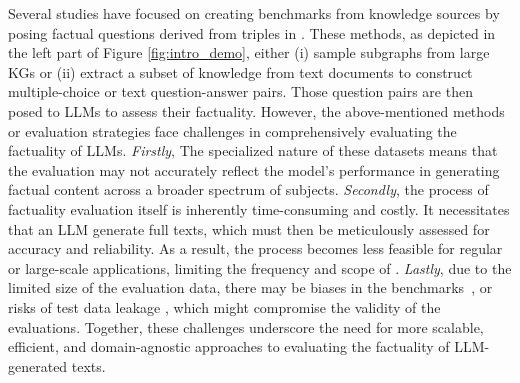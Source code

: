 \pagebreak
Several studies \cite{sun2023head,liang2023holistic} have focused on creating benchmarks from knowledge sources by posing factual questions derived from triples in . %
These methods, as depicted in the left part of Figure \ref{fig:intro_demo}, either (i) sample subgraphs from large KGs or (ii) extract a subset of knowledge from text documents to construct multiple-choice or text question-answer pairs. Those question pairs are then posed to LLMs to assess their factuality.
However, the above-mentioned methods or evaluation strategies face challenges in comprehensively evaluating the factuality of LLMs. 
{\it Firstly}, 
The specialized nature of these datasets means that the evaluation may not accurately reflect the model's performance in generating factual content across a broader spectrum of subjects. {\it Secondly}, the process of factuality evaluation itself is inherently time-consuming and costly. It necessitates that an LLM generate full texts, which must then be meticulously assessed for accuracy and reliability. 
As a result, the process becomes less feasible for regular or large-scale applications, limiting the frequency and scope of 
.
{\it Lastly}, due to the limited size of the evaluation data, there may be biases in the benchmarks~\cite{gallegos2023bias}, or risks of test data leakage \cite{zhou2023dont}, which might compromise the validity of the evaluations.
Together, these challenges underscore the need for more scalable, efficient, and domain-agnostic approaches to evaluating the factuality of LLM-generated texts.




